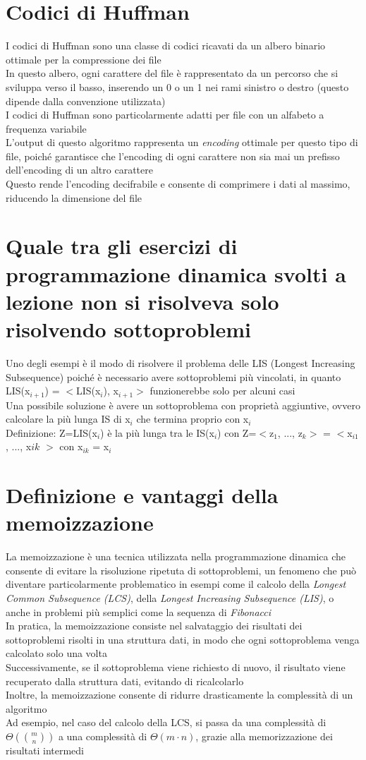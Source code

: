 \documentclass[12pt,oneside,a4paper]{article}
\begin{document}
\section{Codici di Huffman}
I codici di Huffman sono una classe di codici ricavati da un albero binario ottimale per la compressione dei file\\
In questo albero, ogni carattere del file è rappresentato da un percorso che si sviluppa verso il basso, inserendo un 0 o un 1 nei rami sinistro o destro (questo dipende dalla convenzione utilizzata)\\
I codici di Huffman sono particolarmente adatti per file con un alfabeto a frequenza variabile\\
L'output di questo algoritmo rappresenta un \textit{encoding} ottimale per questo tipo di file, poiché garantisce che l'encoding di ogni carattere non sia mai un prefisso dell'encoding di un altro carattere\\
Questo rende l'encoding decifrabile e consente di comprimere i dati al massimo, riducendo la dimensione del file
\section{Quale tra gli esercizi di programmazione dinamica svolti a lezione non si risolveva solo risolvendo sottoproblemi}
Uno degli esempi è il modo di risolvere il problema delle LIS (Longest Increasing Subsequence) poiché è necessario avere sottoproblemi più vincolati, in quanto LIS(x$_{i+1}$) = $<$LIS(x$_{i}$), x$_{i+1}$$>$ funzionerebbe solo per alcuni casi\\
Una possibile soluzione è avere un sottoproblema con proprietà aggiuntive, ovvero calcolare la più lunga IS di x$_i$ che termina proprio con x$_i$\\
Definizione: Z=LIS(x$_i$) è la più lunga tra le IS(x$_i$) con Z=$<$z$_1$, ..., z$_k$$>$ = $<$x$_{i1}$, ..., x$ik$ $>$ con x$_{ik}$ = x$_i$
\section{Definizione e vantaggi della memoizzazione}
La memoizzazione è una tecnica utilizzata nella programmazione dinamica che consente di evitare la risoluzione ripetuta di sottoproblemi, un fenomeno che può diventare particolarmente problematico in esempi come il calcolo della \textit{Longest Common Subsequence (LCS)}, della \textit{Longest Increasing Subsequence (LIS)}, o anche in problemi più semplici come la sequenza di \textit{Fibonacci}\\
In pratica, la memoizzazione consiste nel salvataggio dei risultati dei sottoproblemi risolti in una struttura dati, in modo che ogni sottoproblema venga calcolato solo una volta\\
Successivamente, se il sottoproblema viene richiesto di nuovo, il risultato viene recuperato dalla struttura dati, evitando di ricalcolarlo\\
Inoltre, la memoizzazione consente di ridurre drasticamente la complessità di un algoritmo\\
Ad esempio, nel caso del calcolo della LCS, si passa da una complessità di \( \Theta\left( \binom{m}{n} \right) \) a una complessità di \( \Theta(m \cdot n) \), grazie alla memorizzazione dei risultati intermedi
\end{document}

